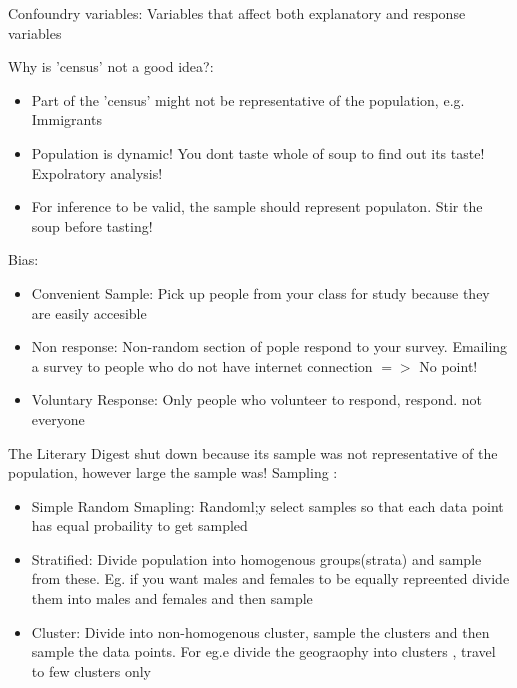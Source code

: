 \documentclass[a4paper]{article}
\begin{document}
Confoundry variables: Variables that affect both explanatory and response variables 

Why is 'census' not a good idea?:
\begin{itemize}
\item Part of the 'census' might not be representative of the population, e.g. Immigrants
\item Population is dynamic! You dont taste whole of soup to find out its taste! Expolratory analysis!

\item For inference to be valid, the sample should represent populaton. Stir the soup before tasting!

\end{itemize}
Bias:
\begin{itemize}
\item Convenient Sample: Pick up people from your class for study because they are easily accesible
\item Non response: Non-random section of pople respond to your survey. Emailing a survey to 
people who do not have internet connection $=>$ No point!
\item Voluntary Response: Only people who volunteer to respond, respond. not everyone
\end{itemize}
The Literary Digest shut down because its sample was not representative of the population, however large the sample was!
Sampling :\\
\begin{itemize}
\item Simple Random Smapling: Randoml;y select samples so that each data point has equal probaility to get sampled
\item Stratified: Divide population into homogenous groups(strata) and sample from these. Eg. if you want males and females to be equally repreented divide them into males and females and then sample
\item Cluster: Divide into non-homogenous cluster, sample the clusters and then sample the data points. For eg.e divide the geograophy into clusters , travel to few clusters only
\end{itemize}
\end{document}
